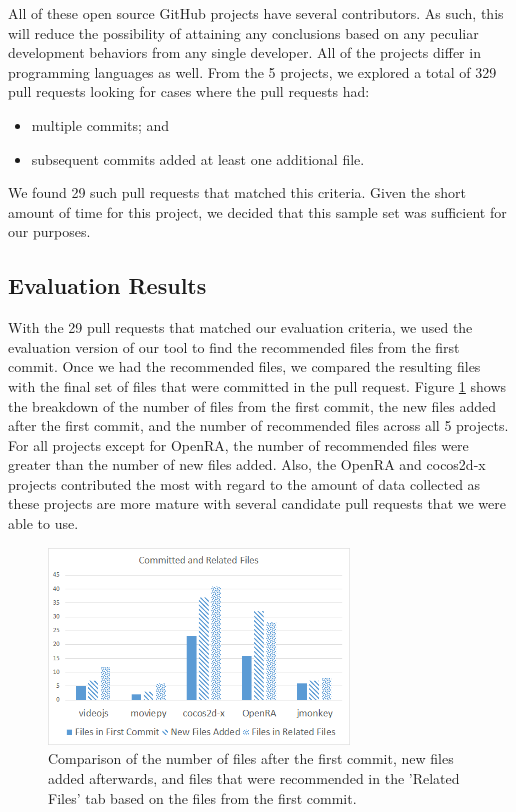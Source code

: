 All of these open source GitHub projects have several contributors. As such, this will reduce the possibility of attaining any conclusions based on any peculiar development behaviors from any single developer. All of the projects differ in programming languages as well. From the 5 projects, we explored a total of 329 pull requests looking for cases where the pull requests had: 

\begin{itemize}
  \item multiple commits; and
  \item subsequent commits added at least one additional file.
\end{itemize}

We found 29 such pull requests that matched this criteria. Given the short amount of time for this project, we decided that this sample set was sufficient for our purposes.

\subsection{Evaluation Results}

With the 29 pull requests that matched our evaluation criteria, we used the evaluation version of our tool to find the recommended files from the first commit. Once we had the recommended files, we compared the resulting files with the final set of files that were committed in the pull request. Figure \ref{fig:committedAndRelatedFiles} shows the breakdown of the number of files from the first commit, the new files added after the first commit, and the number of recommended files across all 5 projects. For all projects except for OpenRA, the number of recommended files were greater than the number of new files added. Also, the OpenRA and cocos2d-x projects contributed the most with regard to the amount of data collected as these projects are more mature with several candidate pull requests that we were able to use.

\begin{figure}[h!]
\includegraphics[width=8cm]{CommittedAndRelatedFiles}
\caption{Comparison of the number of files after the first commit, new files added afterwards, and files that were recommended in the 'Related Files' tab based on the files from the first commit.}
\label{fig:committedAndRelatedFiles}
\end{figure}

